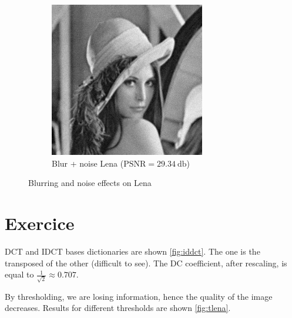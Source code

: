 \documentclass[12pt,english]{article}
\renewcommand{\thesection}{Exercice~\arabic{section}}
\begin{document}
\begin{figure}
\begin{subfigure}[t]{0.4\textwidth}
		\includegraphics[width=.9\textwidth]{img/bnoise}
		\caption{Blur + noise Lena ($\text{PSNR}=\SI{29.34}{\decibel}$)}
		\label{fig:bnoise}
	\end{subfigure}
	\caption{Blurring and noise effects on Lena}
	\label{fig:lenanb}
\end{figure}
\setcounter{section}{7}

\section[]{\thesection}
DCT and IDCT bases dictionaries are shown \autoref{fig:iddct}. The one is the transposed of the other (difficult to see). The DC coefficient, after rescaling, is equal to $\frac{1}{\sqrt{2}}\approx 0.707$.

By thresholding, we are losing information, hence the quality of the image decreases. Results for different thresholds are shown \autoref{fig:tlena}.
\end{document}

